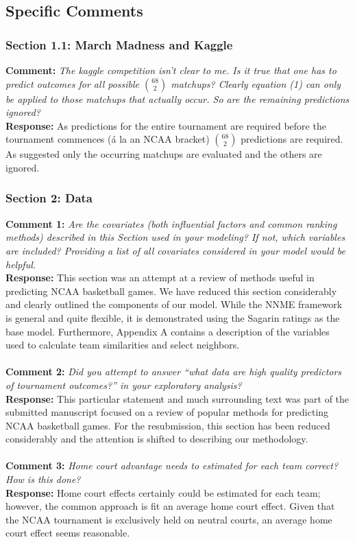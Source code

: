 \documentclass[11pt]{article} %
\begin{document}
\subsection*{Specific Comments}
\subsubsection*{Section 1.1: March Madness and Kaggle}
{\bf Comment:} \emph{The kaggle competition isn't clear to me. Is it true that one has to predict outcomes for all possible ${68 \choose 2}$ matchups? Clearly equation (1) can only be applied to those matchups that actually occur. So are the remaining predictions ignored?\\}
{\bf Response:} As predictions for the entire tournament are required before the tournament commences (\'a la an NCAA bracket) ${68 \choose 2}$ predictions are required. As suggested only the occurring matchups are evaluated and the others are ignored.  \\

\subsubsection*{Section 2: Data}
{\bf Comment 1:} \emph{Are the covariates (both influential factors and common ranking methods) described in this Section used in your modeling? If not, which variables are included? Providing a list of all covariates considered in your model would be helpful.\\}
{\bf Response:} This section was an attempt at a review of methods useful in predicting NCAA basketball games. We have reduced this section considerably and clearly outlined the components of our model. While the NNME framework is general and quite flexible, it is demonstrated using the Sagarin ratings as the base model. Furthermore, Appendix A contains a description of the variables used to calculate team similarities and select neighbors.\\
\\
{\bf Comment 2:} \emph{Did you attempt to answer ``what data are high quality predictors of tournament outcomes?'' in your exploratory analysis?\\}
{\bf Response:} This particular statement and much surrounding text was part of the submitted manuscript focused on a review of popular methods for predicting NCAA basketball games. For the resubmission, this section has been reduced considerably and the attention is shifted to describing our methodology.\\
\\
{\bf Comment 3:} \emph{Home court advantage needs to estimated for each team correct? How is this done?\\}
{\bf Response:} Home court effects certainly could be estimated for each team; however, the common approach is fit an average home court effect. Given that the NCAA tournament is exclusively held on neutral courts, an average home court effect seems reasonable.\\
\end{document}
